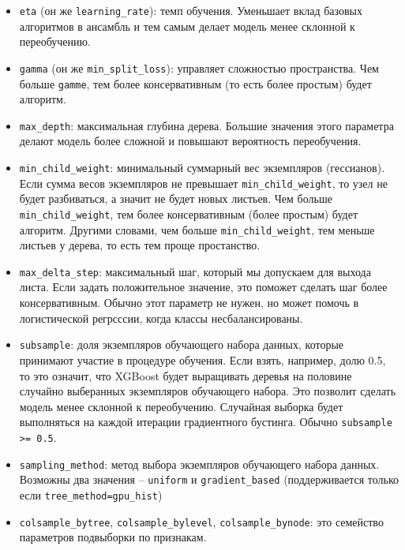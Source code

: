 \documentclass[%
	11pt,
	a4paper,
	utf8,
		]{article}
\begin{document}
\begin{itemize}
	\item \verb|eta| (он же \verb|learning_rate|): темп обучения. Уменьшает вклад базовых алгоритмов в ансамбль и тем самым делает модель менее склонной к переобучению.
	
	\item \verb|gamma| (он же \verb|min_split_loss|): управляет сложностью пространства. Чем больше \verb|gamme|, тем более консервативным (то есть более простым) будет алгоритм.
	
	\item \verb|max_depth|: максимальная глубина дерева. Б\emph{о}льшие значения этого параметра делают модель более сложной и повышают вероятность переобучения.
	
	\item \verb|min_child_weight|: минимальный суммарный вес экземпляров (гессианов). Если сумма весов экземпляров не превышает \verb|min_child_weight|, то узел не будет разбиваться, а значит не будет новых листьев. Чем больше \verb|min_child_weight|, тем более консервативным (более простым) будет алгоритм. Другими словами, чем больше \verb|min_child_weight|, тем меньше листьев у дерева, то есть тем проще простанство.
	
	\item \verb|max_delta_step|: максимальный шаг, который мы допускаем для выхода листа. Если задать положительное значение, это поможет сделать шаг более консервативным. Обычно этот параметр не нужен, но может помочь в логистической регрсссии, когда классы несбалансированы. 
	
	\item \verb|subsample|: доля экземпляров обучающего набора данных, которые принимают участие в процедуре обучения. Если взять, например, долю 0.5, то это означит, что XGBoost будет выращивать деревья на половине случайно выберанных экземпляров обучающего набора. Это позволит сделать модель менее склонной к переобучению. Случайная выборка будет выполняться на каждой итерации градиентного бустинга. Обычно \verb|subsample >= 0.5|.
	
	\item \verb|sampling_method|: метод выбора экземпляров обучающего набора данных. Возможны два значения -- \verb|uniform| и \verb|gradient_based| (поддерживается только если \verb|tree_method=gpu_hist|)
	
	\item \verb|colsample_bytree|, \verb|colsample_bylevel|, \verb|colsample_bynode|: это семейство параметров подвыборки по признакам.
	

\end{itemize}
\end{document}
